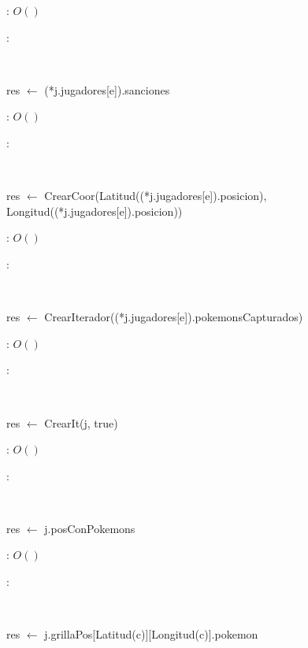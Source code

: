 \begin{Algoritmos}
	\complejidad: $O()$

	\justifcomp:

	~

	\begin{algorithm}[H]
		\NoCaptionOfAlgo
		\caption{}
		res $\leftarrow$ (*j.jugadores[e]).sanciones\;
	\end{algorithm}

	\complejidad: $O()$

	\justifcomp:

	~

	\begin{algorithm}[H]
		\NoCaptionOfAlgo
		\caption{}
		res $\leftarrow$ CrearCoor(Latitud((*j.jugadores[e]).posicion), Longitud((*j.jugadores[e]).posicion))\;
	\end{algorithm}

	\complejidad: $O()$

	\justifcomp:

	~

	\begin{algorithm}[H]
		\NoCaptionOfAlgo
		\caption{}
		res $\leftarrow$ CrearIterador((*j.jugadores[e]).pokemonsCapturados)\;
	\end{algorithm}

	\complejidad: $O()$

	\justifcomp:

	~

	\begin{algorithm}[H]
		\NoCaptionOfAlgo
		\caption{}
		res $\leftarrow$ CrearIt(j, true)
	\end{algorithm}

	\complejidad: $O()$

	\justifcomp:

	~

	\begin{algorithm}[H]
		\NoCaptionOfAlgo
		\caption{}
		res $\leftarrow$ j.posConPokemons\;
	\end{algorithm}

	\complejidad: $O()$

	\justifcomp:

	~

	\begin{algorithm}[H]
		\NoCaptionOfAlgo
		\caption{}
		res $\leftarrow$ j.grillaPos[Latitud(c)][Longitud(c)].pokemon\;
	\end{algorithm}


\end{Algoritmos}
